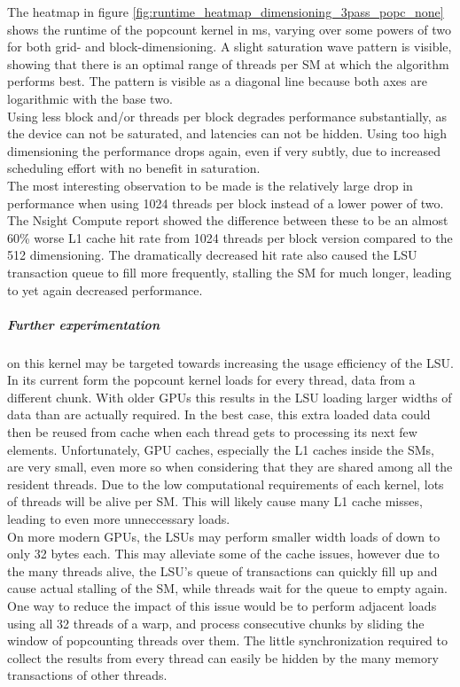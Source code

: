 \documentclass{tudscrreprt}
\begin{document}
			The heatmap in figure \ref{fig:runtime_heatmap_dimensioning_3pass_popc_none} shows the runtime of the popcount kernel in ms, varying over some powers of two for both grid- and block-dimensioning. A slight saturation wave pattern is visible, showing that there is an optimal range of threads per SM at which the algorithm performs best. The pattern is visible as a diagonal line because both axes are logarithmic with the base two. \\
			Using less block and/or threads per block degrades performance substantially, as the device can not be saturated, and latencies can not be hidden. Using too high dimensioning the performance drops again, even if very subtly, due to increased scheduling effort with no benefit in saturation. \\
			The most interesting observation to be made is the relatively large drop in performance when using 1024 threads per block instead of a lower power of two. The Nsight Compute report showed the difference between these to be an almost 60\% worse L1 cache hit rate from 1024 threads per block version compared to the 512 dimensioning. The dramatically decreased hit rate also caused the LSU transaction queue to fill more frequently, stalling the SM for much longer, leading to yet again decreased performance. \\
			
			\subparagraph{Further experimentation} on this kernel may be targeted towards increasing the usage efficiency of the LSU. \\
			In its current form the popcount kernel loads for every thread, data from a different chunk. With older GPUs this results in the LSU loading larger widths of data than are actually required. In the best case, this extra loaded data could then be reused from cache when each thread gets to processing its next few elements. Unfortunately, GPU caches, especially the L1 caches inside the SMs, are very small, even more so when considering that they are shared among all the resident threads. Due to the low computational requirements of each kernel, lots of threads will be alive per SM. This will likely cause many L1 cache misses, leading to even more unneccessary loads. \\
			On more modern GPUs, the LSUs may perform smaller width loads of down to only 32 bytes each. This may alleviate some of the cache issues, however due to the many threads alive, the LSU's queue of transactions can quickly fill up and cause actual stalling of the SM, while threads wait for the queue to empty again. \\
			One way to reduce the impact of this issue would be to perform adjacent loads using all 32 threads of a warp, and process consecutive chunks by sliding the window of popcounting threads over them. The little synchronization required to collect the results from every thread can easily be hidden by the many memory transactions of other threads. \\
		
\end{document}
